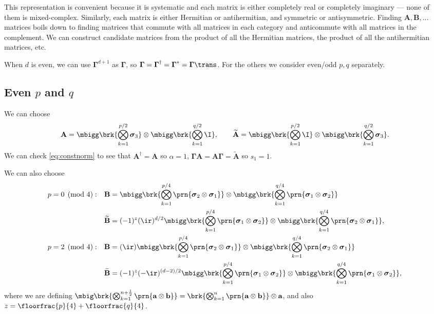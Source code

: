 \documentclass[11pt]{article}
\newcommand{\Gammab}{\boldsymbol{\Gamma}}
\newcommand{\A}{\mathbf{A}}
\newcommand{\B}{\mathbf{B}}
\newcommand{\At}{\widetilde{\A}}
\newcommand{\Bt}{\widetilde{\B}}
\newcommand{\sigmab}{\boldsymbol{\sigma}}
\begin{document}
This representation is convenient because it is systematic and each matrix is either completely real or completely imaginary --- none of them is mixed-complex.
Similarly, each matrix is either Hermitian or antihermitian, and symmetric or antisymmetric.
Finding $\A, \B, \dots$ matrices boils down to finding matrices that commute with all matrices in each category and anticommute with all matrices in the complement.
We can construct candidate matrices from the product of all the Hermitian matrices, the product of all the antihermitian matrices, etc.

When $d$ is even, we can use $\Gammab^{d+1}$ as $\Gammab$, so $\Gammab = \Gammab^\dag = \Gammab^\ast =\Gammab\trans$.
For the others we consider even/odd $p,q$ separately.


\subsection{Even \texorpdfstring{$p$ and $q$}{p and q}}\label{sec:eveneven}

We can choose
%
\begin{equation*}
  \A = \mbigg\brk{\bigotimes_{k=1}^{p/2} \sigmab_3}
        \otimes \mbigg\brk{\bigotimes_{k=1}^{q/2} \I},
  \qquad
  \At = \mbigg\brk{\bigotimes_{k=1}^{p/2} \I}
        \otimes \mbigg\brk{\bigotimes_{k=1}^{q/2} \sigmab_3}.
\end{equation*}
%
We can check \cref{eq:constnorm} to see that $\A^\dag = \A$ so $\alpha=1$, $\Gammab \A = \A \Gammab = \At$ so $s_1 = 1$.

We can also choose
%
\begin{equation*}
\begin{aligned}
  p &= 0 \pmod 4: &
  \B &= \mbigg\brk{\bigotimes_{k=1}^{p/4} \prn{\sigmab_2 \otimes \sigmab_1}} \otimes
        \mbigg\brk{\bigotimes_{k=1}^{q/4} \prn{\sigmab_1 \otimes \sigmab_2}} \\ &&
  \Bt &= (-1)^{z} (\ir)^{d/2}
        \mbigg\brk{\bigotimes_{k=1}^{p/4} \prn{\sigmab_1 \otimes \sigmab_2}} \otimes
        \mbigg\brk{\bigotimes_{k=1}^{q/4} \prn{\sigmab_2 \otimes \sigmab_1}},
  \\
  p &= 2 \pmod 4: &
  \B &= (\ir)
        \mbigg\brk{\bigotimes_{k=1}^{p/4} \prn{\sigmab_2 \otimes \sigmab_1}} \otimes
        \mbigg\brk{\bigotimes_{k=1}^{q/4} \prn{\sigmab_2 \otimes \sigmab_1}} \\ &&
  \Bt &= (-1)^{z} (-\ir)^{(d-2)/2}
        \mbigg\brk{\bigotimes_{k=1}^{p/4} \prn{\sigmab_1 \otimes \sigmab_2}} \otimes
        \mbigg\brk{\bigotimes_{k=1}^{q/4} \prn{\sigmab_1 \otimes \sigmab_2}},
\end{aligned}
\end{equation*}
%
where we are defining \( \mbig\brk{\bigotimes_{k=1}^{n+\frac{1}{2}} \prn{\mathbf{a} \otimes \mathbf{b}}}
= \brk{\bigotimes_{k=1}^{n} \prn{\mathbf{a} \otimes \mathbf{b}}} \otimes \mathbf{a} \),
and also $z = \floorfrac{p}{4} + \floorfrac{q}{4}$.
\end{document}
